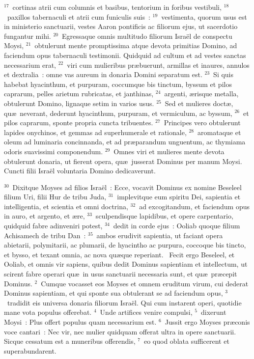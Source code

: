 ${}^{17}$~cortinas atrii cum columnis et basibus, tentorium in foribus vestibuli,
${}^{18}$~paxillos tabernaculi et atrii cum funiculis suis~:
${}^{19}$~vestimenta, quorum usus est in ministerio sanctuarii, vestes Aaron pontificis ac filiorum ejus, ut sacerdotio fungantur mihi.
${}^{20}$~Egressaque omnis multitudo filiorum Isra\"el de conspectu Moysi,
${}^{21}$~obtulerunt mente promptissima atque devota primitias Domino, ad faciendum opus tabernaculi testimonii. Quidquid ad cultum et ad vestes sanctas necessarium erat,
${}^{22}$~viri cum mulieribus pr\ae buerunt, armillas et inaures, annulos et dextralia~: omne vas aureum in donaria Domini separatum est.
${}^{23}$~Si quis habebat hyacinthum, et purpuram, coccumque bis tinctum, byssum et pilos caprarum, pelles arietum rubricatas, et janthinas,
${}^{24}$~argenti, \ae risque metalla, obtulerunt Domino, lignaque setim in varios usus.
${}^{25}$~Sed et mulieres doct\ae , qu\ae\ neverant, dederunt hyacinthum, purpuram, et vermiculum, ac byssum,
${}^{26}$~et pilos caprarum, sponte propria cuncta tribuentes.
${}^{27}$~Principes vero obtulerunt lapides onychinos, et gemmas ad superhumerale et rationale,
${}^{28}$~aromataque et oleum ad luminaria concinnanda, et ad pr\ae parandum unguentum, ac thymiama odoris suavissimi componendum.
${}^{29}$~Omnes viri et mulieres mente devota obtulerunt donaria, ut fierent opera, qu\ae\ jusserat Dominus per manum Moysi. Cuncti filii Isra\"el voluntaria Domino dedicaverunt.


${}^{30}$~Dixitque Moyses ad filios Isra\"el~: Ecce, vocavit Dominus ex nomine Beseleel filium Uri, filii Hur de tribu Juda,
${}^{31}$~implevitque eum spiritu Dei, sapientia et intelligentia, et scientia et omni doctrina,
${}^{32}$~ad excogitandum, et faciendum opus in auro, et argento, et \ae re,
${}^{33}$~sculpendisque lapidibus, et opere carpentario, quidquid fabre adinveniri potest,
${}^{34}$~dedit in corde ejus~: Ooliab quoque filium Achisamech de tribu Dan~:
${}^{35}$~ambos erudivit sapientia, ut faciant opera abietarii, polymitarii, ac plumarii, de hyacintho ac purpura, coccoque bis tincto, et bysso, et texant omnia, ac nova qu\ae que reperiant.
~\lettrine[lines=10,image=true,loversize=0.05,lraise=-0.03]{F}{}ecit ergo Beseleel, et Ooliab, et omnis vir sapiens, quibus dedit Dominus sapientiam et intellectum, ut scirent fabre operari qu\ae\ in usus sanctuarii necessaria sunt, et qu\ae\ pr\ae cepit Dominus.
${}^{2}$~Cumque vocasset eos Moyses et omnem eruditum virum, cui dederat Dominus sapientiam, et qui sponte sua obtulerant se ad faciendum opus,
${}^{3}$~tradidit eis universa donaria filiorum Isra\"el. Qui cum instarent operi, quotidie mane vota populus offerebat.
${}^{4}$~Unde artifices venire compulsi,
${}^{5}$~dixerunt Moysi~: Plus offert populus quam necessarium est.
${}^{6}$~Jussit ergo Moyses pr\ae conis voce cantari~: Nec vir, nec mulier quidquam offerat ultra in opere sanctuarii. Sicque cessatum est a muneribus offerendis,
${}^{7}$~eo quod oblata sufficerent et superabundarent.


